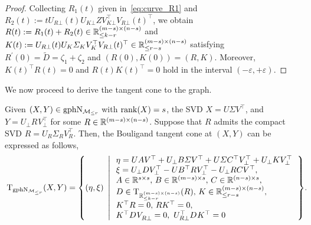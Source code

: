 \begin{proof}
    Collecting $R_1(t)$ given in~\eqref{eq:curve_R1} and $R_2(t):=tU_{R\bot}(t)U_{K\bot} ZV_{K\bot}^\top V_{R\bot}(t)^\top$, we obtain $R(t):=R_1(t)+R_2(t)\in\mathbb{R}^{(m-s)\times(n-s)}_{\le k-r}$ and $K(t):=U_{R\bot}(t)U_K\varSigma_K V_K^\top V_{R\bot}(t)^\top\in\mathbb{R}^{(m-s)\times(n-s)}_{\le r-s}$ satisfying $R^\prime(0)=\tilde{D}=\zeta_1+\zeta_2$ and $(R(0),K(0))=(R,K)$. Moreover, $K(t)^\top R(t)=0$ and $R(t)K(t)^\top=0$ hold in the interval $(-\varepsilon,+\varepsilon)$.
\end{proof}

 

We now proceed to derive the tangent cone to the graph.

\begin{theorem}\label{the:Btangent_graph}
    Given $(X,Y)\in\mathrm{gph}\mathrm{N}_{\mathcal{M}_{\le r}}$ with $\operatorname{rank}(X)=s$, the SVD $X=U\varSigma V^\top$, and $Y=U^{}_{\bot} R_{}^{}V_{\bot}^\top$ for some $R\in\mathbb{R}^{(m-s)\times (n-s)}$. Suppose that $R$ admits the compact SVD $R=U_R\varSigma_RV_R^\top$. Then, the Bouligand tangent cone at $(X,Y)$ can be expressed as follows,
    \begin{equation}\label{eq:Btangent_graph}
        \Btangent_{\graph\Lnormal_{\boundedrank}}(X,Y)=\hkh{ (\eta,\xi)\ \left|\,\begin{array}{l}
            \eta = UAV^\top + U_\bot B\varSigma V^\top + U\varSigma C^\top V_\bot^\top + U_\bot K V^\top_\bot
           \\
           \xi = U_\bot DV_\bot ^\top - U B^\top RV_\bot^\top - U_\bot R CV^\top, 
            \\
            A\in\mbR^{s\times s},\,B\in\mbR^{(m-s)\times s},\,C\in\mbR^{(n-s)\times s},
            \\
            D\in\tangent_{\mbR_{\le k-r}^{(m-s)\times (n-s)}}(R),\, K\in\mbR^{(m-s)\times(n-s)}_{\le r-s},
            \\
           K^\top R=0,\,R K^\top=0,
           \\
           K_{}^\top D_{}^{}V^{}_{R\bot}=0,\ U_{R\bot}^\top D_{}^{}K_{}^\top =0
        \end{array} \right.
        }\!.\!\!\!\!\!
    \end{equation}
\end{theorem}

